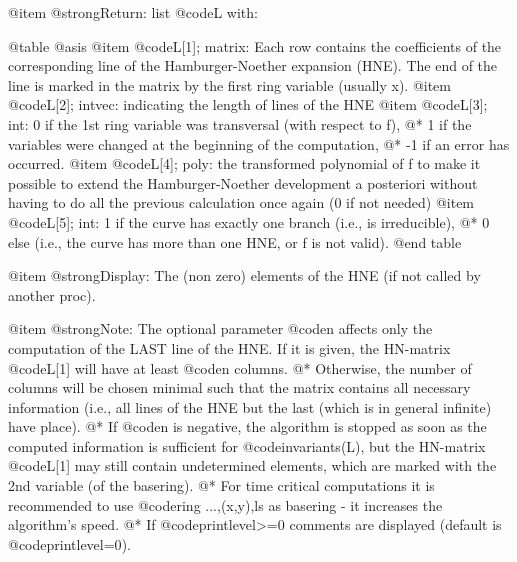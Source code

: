 @item @strong{Return:}
list @code{L} with:

@table @asis
@item @code{L[1]}; matrix:
         Each row contains the coefficients of the corresponding line of the
         Hamburger-Noether expansion (HNE). The end of the line is marked in
         the matrix by the first ring variable (usually x).
@item @code{L[2]}; intvec:
         indicating the length of lines of the HNE
@item @code{L[3]}; int:
         0  if the 1st ring variable was transversal (with respect to f), @*
         1  if the variables were changed at the beginning of the
            computation, @*
        -1  if an error has occurred.
@item @code{L[4]}; poly:
         the transformed polynomial of f to make it possible to extend the
         Hamburger-Noether development a posteriori without having to do
         all the previous calculation once again (0 if not needed)
@item @code{L[5]}; int:
         1  if the curve has exactly one branch (i.e., is irreducible), @*
         0  else (i.e., the curve has more than one HNE, or f is not valid).
@end table

@item @strong{Display:}
The (non zero) elements of the HNE (if not called by another proc).

@item @strong{Note:}
The optional parameter @code{n} affects only the computation of
the LAST line of the HNE. If it is given, the HN-matrix @code{L[1]}
will have at least @code{n} columns. @*
Otherwise, the number of columns will be chosen minimal such that the
matrix contains all necessary information (i.e., all lines of the HNE
but the last (which is in general infinite) have place). @*
If @code{n} is negative, the algorithm is stopped as soon as the
computed information is sufficient for @code{invariants(L)}, but the
HN-matrix @code{L[1]} may still contain undetermined elements, which
are marked with the 2nd variable (of the basering). @*
For time critical computations it is recommended to use
@code{ring ...,(x,y),ls} as basering - it increases the algorithm's
speed. @*
If @code{printlevel>=0} comments are displayed (default is
@code{printlevel=0}).


